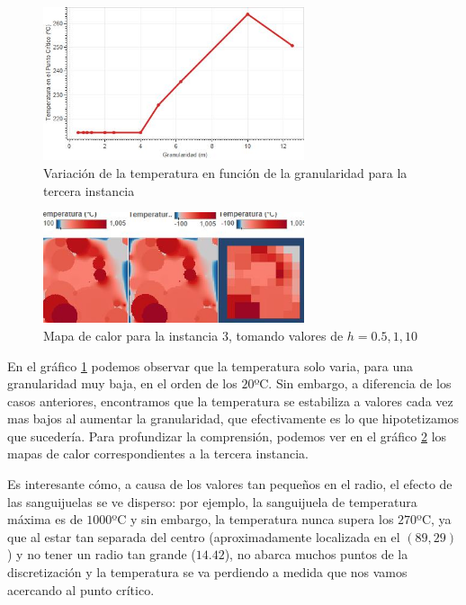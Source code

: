 \begin{figure}[h]
    \centering
    \includegraphics[width=0.685\textwidth]{experimento 1-3}
    \caption{Variación de la temperatura en función de la granularidad para la tercera instancia}
    \label{fig:exp13}
\end{figure}

\begin{figure}[h]
    \centering
    \includegraphics[width=0.685\textwidth]{Ejemplo Instancia 3}
    \caption{Mapa de calor para la instancia 3, tomando valores de $h = 0.5, 1, 10$}
    \label{fig:exp13-vis}
\end{figure}

En el gráfico \ref{fig:exp13} podemos observar que la temperatura solo varia, para una granularidad muy baja, en el orden de los $20$ºC. Sin embargo, a diferencia de los casos anteriores, encontramos que la temperatura se estabiliza a valores cada vez mas bajos al aumentar la granularidad, que efectivamente es lo que hipotetizamos que sucedería. Para profundizar la comprensión, podemos ver en el gráfico \ref{fig:exp13-vis} los mapas de calor correspondientes a la tercera instancia.

Es interesante cómo, a causa de los valores tan pequeños en el radio, el efecto de las sanguijuelas se ve disperso: por ejemplo, la sanguijuela de temperatura máxima es de $1000$ºC y sin embargo, la temperatura nunca supera los $270$ºC, ya que al estar tan separada del centro (aproximadamente localizada en el $(89, 29)$) y no tener un radio tan grande ($14.42$), no abarca muchos puntos de la discretización y la temperatura se va perdiendo a medida que nos vamos acercando al punto crítico.

